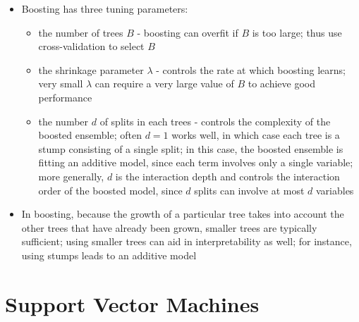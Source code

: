 \documentclass[12pt]{article}
\begin{document}
\begin{itemize}
\item Boosting has three tuning parameters: \begin{itemize} 
\item the number of trees $B$ - boosting can overfit if $B$ is too large; thus use cross-validation to select $B$ 
\item the shrinkage parameter $\lambda$ - controls the rate at which boosting learns; very small $\lambda$ can require a very large value of $B$ to achieve good performance 
\item the number $d$ of splits in each trees - controls the complexity of the boosted ensemble; often $d=1$ works well, in which case each tree is a stump consisting of a single split; in this case, the boosted ensemble is fitting an additive model, since each term involves only a single variable; more generally, $d$ is the interaction depth and controls the interaction order of the boosted model, since $d$ splits can involve at most $d$ variables \end{itemize} 
\item In boosting, because the growth of a particular tree takes into account the other trees that have already been grown, smaller trees are typically sufficient; using smaller trees can aid in interpretability as well; for instance, using stumps leads to an additive model 
\end{itemize}

\section{Support Vector Machines}
\end{document}
